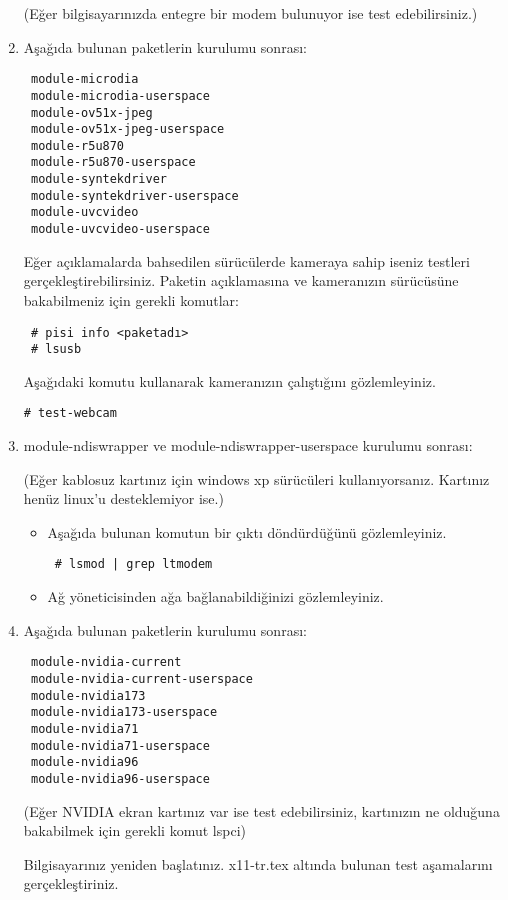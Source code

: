 \documentclass[a4paper,10pt]{article}
\begin{document}
\begin{enumerate}
(Eğer bilgisayarınızda entegre bir modem bulunuyor ise test edebilirsiniz.)


\item Aşağıda bulunan paketlerin kurulumu sonrası:
\begin{verbatim}
 module-microdia
 module-microdia-userspace
 module-ov51x-jpeg
 module-ov51x-jpeg-userspace
 module-r5u870
 module-r5u870-userspace
 module-syntekdriver
 module-syntekdriver-userspace
 module-uvcvideo
 module-uvcvideo-userspace
\end{verbatim}

Eğer açıklamalarda bahsedilen sürücülerde kameraya sahip iseniz testleri gerçekleştirebilirsiniz.
Paketin açıklamasına ve kameranızın sürücüsüne bakabilmeniz için gerekli komutlar:
\begin{verbatim}
 # pisi info <paketadı>
 # lsusb
\end{verbatim}

Aşağıdaki komutu kullanarak kameranızın çalıştığını gözlemleyiniz.
\begin{verbatim}
# test-webcam
\end{verbatim}

\item module-ndiswrapper ve module-ndiswrapper-userspace kurulumu sonrası:

(Eğer kablosuz kartınız için windows xp sürücüleri kullanıyorsanız. Kartınız henüz linux'u desteklemiyor ise.)

\begin{itemize}
 \item Aşağıda bulunan komutun bir çıktı döndürdüğünü gözlemleyiniz.
 \begin{verbatim}
 # lsmod | grep ltmodem
 \end{verbatim}
\item Ağ yöneticisinden ağa bağlanabildiğinizi gözlemleyiniz.
\end{itemize}

\item Aşağıda bulunan paketlerin kurulumu sonrası:
 \begin{verbatim}
 module-nvidia-current
 module-nvidia-current-userspace
 module-nvidia173
 module-nvidia173-userspace
 module-nvidia71
 module-nvidia71-userspace
 module-nvidia96
 module-nvidia96-userspace
\end{verbatim}
(Eğer NVIDIA ekran kartınız var ise test edebilirsiniz, kartınızın ne olduğuna bakabilmek için gerekli komut lspci)

Bilgisayarınız yeniden başlatınız. x11-tr.tex altında bulunan test aşamalarını gerçekleştiriniz.


\end{enumerate}
\end{document}
